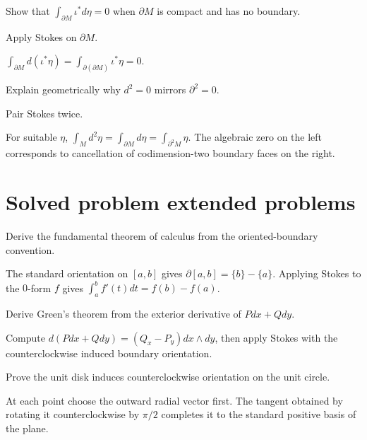 \begin{exercise}\label{exr:vii11-23}
Show that $\int_{\partial M}\iota^*d\eta=0$ when $\partial M$ is compact and has no boundary.
\end{exercise}
\begin{hint}
Apply Stokes on $\partial M$.
\end{hint}
\begin{solution}
$\int_{\partial M}d(\iota^*\eta)=\int_{\partial(\partial M)}\iota^*\eta=0$.
\end{solution}

\begin{exercise}\label{exr:vii11-24}
Explain geometrically why $d^2=0$ mirrors $\partial^2=0$.
\end{exercise}
\begin{hint}
Pair Stokes twice.
\end{hint}
\begin{solution}
For suitable $\eta$, $\int_Md^2\eta=\int_{\partial M}d\eta=\int_{\partial^2M}\eta$. The algebraic zero on the left corresponds to cancellation of codimension-two boundary faces on the right.
\end{solution}


\section{Solved problem extended problems}

\begin{problem}\label{prob:vii11-01}
Derive the fundamental theorem of calculus from the oriented-boundary convention.
\end{problem}
\begin{solution}
The standard orientation on $[a,b]$ gives $\partial[a,b]=\{b\}-\{a\}$. Applying Stokes to the $0$-form $f$ gives $\int_a^bf'(t)dt=f(b)-f(a)$.
\end{solution}

\begin{problem}\label{prob:vii11-02}
Derive Green's theorem from the exterior derivative of $Pdx+Qdy$.
\end{problem}
\begin{solution}
Compute $d(Pdx+Qdy)=(Q_x-P_y)dx\wedge dy$, then apply Stokes with the counterclockwise induced boundary orientation.
\end{solution}

\begin{problem}\label{prob:vii11-03}
Prove the unit disk induces counterclockwise orientation on the unit circle.
\end{problem}
\begin{solution}
At each point choose the outward radial vector first. The tangent obtained by rotating it counterclockwise by $\pi/2$ completes it to the standard positive basis of the plane.
\end{solution}

